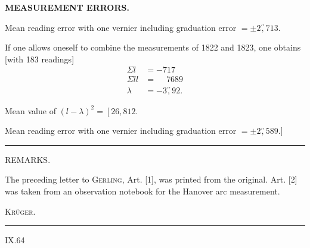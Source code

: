 \par\clearpage
\noindent\null\hfill{\small\textbf{MEASUREMENT ERRORS.}}\hfill{}\par\medskip
\par\noindent\hspace*{\parindent}Mean reading error with one vernier including graduation error $=\pm2\overset{\prime\prime}{,}713$.
\par\noindent\hspace*{\parindent}If one allows oneself to combine the measurements of 1822 and 1823, one obtains [with 183 readings]
\[
\begin{aligned}
\Sigma l&=-717\\
\Sigma ll&=\phantom{-}7689\\
\lambda&=-3\overset{\prime\prime}{,}92.
\end{aligned}
\]
\par\noindent\hspace*{\parindent}Mean value of $(l-\lambda)^2=\left[26{,}812.\right.$
\par\noindent\hspace*{\parindent}Mean reading error with one vernier including graduation error $=\pm2\overset{\prime\prime}{,}589.]$
\par\bigskip\bigskip
\begin{center}\rule{2.6cm}{.4pt}\end{center}
\vspace{1.5cm}
{\small
\begin{center}REMARKS.\end{center}
\par\noindent\hspace*{\parindent}The preceding letter to \textsc{Gerling}, Art. [1], was printed from the original. Art. [2] was taken from an observation notebook for the Hanover arc measurement.
\par\noindent\hfill\textsc{Krüger.}\hspace*{1em}\par}
\vspace{2cm}
\begin{center}\rule{3.5cm}{.4pt}\end{center}

\vfill
\noindent IX.\hfill 64\hspace*{1cm}\par

\par\clearpage
\null

